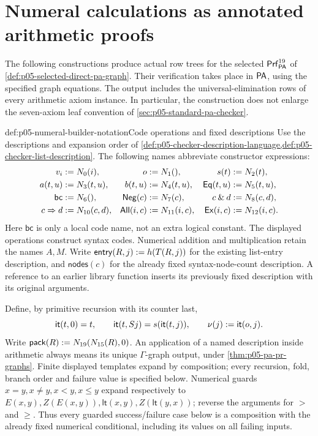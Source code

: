 \section{Numeral calculations as annotated arithmetic proofs}
\label{sec:p05-pa-numeral-proof-builders}

The following constructions produce actual row trees for the selected
\(\mathsf{Prf}^{19}_{\mathsf{PA}}\) of
\cref{def:p05-selected-direct-pa-graph}. Their verification takes place in
\(\mathsf{PA}\), using the specified graph equations. The output includes the
universal-elimination rows of every arithmetic axiom instance. In particular,
the construction does not enlarge the seven-axiom leaf convention of
\cref{sec:p05-standard-pa-checker}.

\begin{hbdefinition}{def:p05-numeral-builder-notation}{Code operations and fixed descriptions}
Use the descriptions and expansion order of
\cref{def:p05-checker-description-language,def:p05-checker-list-description}.
The following names abbreviate constructor expressions:
\[
\begin{aligned}
 v_i&\mathrel{:=} N_0(i),& o&\mathrel{:=} N_1(),& s(t)&\mathrel{:=} N_2(t),\\
 a(t,u)&\mathrel{:=} N_3(t,u),& b(t,u)&\mathrel{:=} N_4(t,u),&
 \mathsf{Eq}(t,u)&\mathrel{:=} N_5(t,u),\\
 \mathsf{bc}&\mathrel{:=} N_6(),& \mathsf{Neg}(c)&\mathrel{:=} N_7(c),&
 c\mathbin{\&}d&\mathrel{:=} N_8(c,d),\\
 c\Rightarrow d&\mathrel{:=} N_{10}(c,d),&
 \mathsf{All}(i,c)&\mathrel{:=} N_{11}(i,c),&
 \mathsf{Ex}(i,c)&\mathrel{:=} N_{12}(i,c).
\end{aligned}
\]
Here \(\mathsf{bc}\) is only a local code name, not an extra logical constant.
The displayed operations construct syntax codes. Numerical addition and
multiplication retain the names \(A,M\). Write
\(\mathsf{entry}(R,j)\mathrel{:=} h(T(R,j))\) for the existing list-entry
description, and \(\mathsf{nodes}(c)\) for the already fixed syntax-node-count
description. A reference to an earlier library function inserts its previously
fixed description with its original arguments.

Define, by primitive recursion with its counter last,
\[
 \mathsf{it}(t,0)=t,\qquad
 \mathsf{it}(t,Sj)=s(\mathsf{it}(t,j)),\qquad
 \nu(j)\mathrel{:=}\mathsf{it}(o,j).
\]
Write \(\mathsf{pack}(R)\mathrel{:=} N_{19}(N_{15}(R),0)\).
An application of a named description inside arithmetic always means its
unique \(\Gamma\)-graph output, under
\cref{thm:p05-pa-pr-graphs}. Finite displayed templates expand by composition;
every recursion, fold, branch order and failure value is specified below.
Numerical guards \(x=y,x\ne y,x<y,x\leq y\) expand respectively to
\(E(x,y),Z(E(x,y)),\mathsf{lt}(x,y),Z(\mathsf{lt}(y,x))\);
reverse the arguments for \(>\) and \(\geq\). Thus every guarded
success/failure case below is a composition with the already fixed numerical
conditional, including its values on all failing inputs.
\end{hbdefinition}

